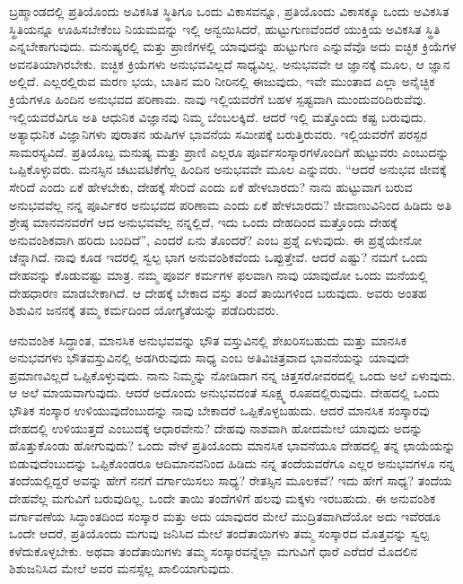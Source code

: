 ಬ್ರಹ್ಮಾಂಡದಲ್ಲಿ ಪ್ರತಿಯೊಂದು ಅವಿಕಸಿತ ಸ್ಥಿತಿಗೂ ಒಂದು ವಿಕಾಸವನ್ನೂ, ಪ್ರತಿಯೊಂದು ವಿಕಾಸಕ್ಕೂ ಒಂದು ಅವಿಕಸಿತ ಸ್ಥಿತಿಯನ್ನೂ ಊಹಿಸಬೇಕೆಂಬ ನಿಯಮವನ್ನು ಇಲ್ಲಿ ಅನ್ವಯಿಸಿದರೆ, ಹುಟ್ಟುಗುಣವೆಂದರೆ ಯುಕ್ತಿಯ ಅವಿಕಸಿತ ಸ್ಥಿತಿ ಎನ್ನಬೇಕಾಗುವುದು. ಮನುಷ್ಯರಲ್ಲಿ ಮತ್ತು ಪ್ರಾಣಿಗಳಲ್ಲಿ ಯಾವುದನ್ನು ಹುಟ್ಟುಗುಣ ಎನ್ನುವೆವೊ ಅದು ಐಚ್ಛಿಕ ಕ್ರಿಯೆಗಳ ಅವನತಿಯಾಗಿರಬೇಕು. ಐಚ್ಛಿಕ ಕ್ರಿಯೆಗಳು ಅನುಭವವಿಲ್ಲದೆ ಸಾಧ್ಯವಿಲ್ಲ. ಅನುಭವವೇ ಆ ಜ್ಞಾನಕ್ಕೆ ಮೂಲ, ಆ ಜ್ಞಾನ ಅಲ್ಲಿದೆ. ಎಲ್ಲರಲ್ಲಿರುವ ಮರಣ ಭಯ, ಬಾತಿನ ಮರಿ ನೀರಿನಲ್ಲಿ ಈಜುವುದು, ಇವೇ ಮುಂತಾದ ಎಲ್ಲಾ ಅನೈಚ್ಛಿಕ ಕ್ರಿಯೆಗಳೂ ಹಿಂದಿನ ಅನುಭವದ ಪರಿಣಾಮ. ನಾವು ಇಲ್ಲಿಯವರೆಗೆ ಬಹಳ ಸ್ಪಷ್ಟವಾಗಿ ಮುಂದುವರಿದಿರುವೆವು. ಇಲ್ಲಿಯವರೆವಿಗೂ ಅತಿ ಆಧುನಿಕ ವಿಜ್ಞಾನವು ನಿಮ್ಮ ಬೆಂಬಲಕ್ಕಿದೆ. ಆದರೆ ಇಲ್ಲಿ ಮತ್ತೊಂದು ಕಷ್ಟ ಬರುವುದು. ಅತ್ಯಾಧುನಿಕ ವಿಜ್ಞಾನಿಗಳು ಪುರಾತನ ಋಷಿಗಳ ಭಾವನೆಯ ಸಮೀಪಕ್ಕೆ ಬರುತ್ತಿರುವರು. ಇಲ್ಲಿಯವರೆಗೆ ಪರಸ್ಪರ ಸಾಮರಸ್ಯವಿದೆ. ಪ್ರತಿಯೊಬ್ಬ ಮನುಷ್ಯ ಮತ್ತು ಪ್ರಾಣಿ ಎಲ್ಲರೂ ಪೂರ್ವಸಂಸ್ಕಾರಗಳೊಂದಿಗೆ ಹುಟ್ಟುವರು ಎಂಬುದನ್ನು ಒಪ್ಪಿಕೊಳ್ಳುವರು. ಮನಸ್ಸಿನ ಚಟುವಟಿಕೆಗೆಲ್ಲ ಹಿಂದಿನ ಅನುಭವವೇ ಮೂಲ ಎನ್ನುವರು. “ಆದರೆ ಅನುಭವ ಜೀವಕ್ಕೆ ಸೇರಿದೆ ಎಂದು ಏಕೆ ಹೇಳಬೇಕು, ದೇಹಕ್ಕೆ ಸೇರಿದೆ ಎಂದು ಏಕೆ ಹೇಳಬಾರದು? ನಾನು ಹುಟ್ಟುವಾಗ ಬರುವ ಅನುಭವವೆಲ್ಲ ನನ್ನ ಪೂರ್ವಿಕರ ಅನುಭವದ ಪರಿಣಾಮ ಎಂದು ಏಕೆ ಹೇಳಬಾರದು? ಜೀವಾಣುವಿನಿಂದ ಹಿಡಿದು ಅತಿ ಶ್ರೇಷ್ಠ ಮಾನವನವರೆಗೆ ಆದ ಅನುಭವವೆಲ್ಲ ನನ್ನಲ್ಲಿದೆ, ಇದು ಒಂದು ದೇಹದಿಂದ ಮತ್ತೊಂದು ದೇಹಕ್ಕೆ ಅನುವಂಶಿಕವಾಗಿ ಹರಿದು ಬಂದಿದೆ”, ಎಂದರೆ ಏನು ತೊಂದರೆ? ಎಂಬ ಪ್ರಶ್ನೆ ಏಳುವುದು. ಈ ಪ್ರಶ್ನೆಯೇನೋ ಚೆನ್ನಾಗಿದೆ. ನಾವು ಕೂಡ ಇದರಲ್ಲಿ ಸ್ವಲ್ಪ ಭಾಗ ಅನುವಂಶಿಕವೆಂದು ಒಪ್ಪುತ್ತೇವೆ. ಆದರೆ ಎಷ್ಟು? ನಮಗೆ ಒಂದು ದೇಹವನ್ನು ಕೊಡುವಷ್ಟು ಮಾತ್ರ. ನಮ್ಮ ಪೂರ್ವ ಕರ್ಮಗಳ ಫಲವಾಗಿ ನಾವು ಯಾವುದೋ ಒಂದು ಮನೆಯಲ್ಲಿ ದೇಹಧಾರಣ ಮಾಡಬೇಕಾಗಿದೆ. ಆ ದೇಹಕ್ಕೆ ಬೇಕಾದ ವಸ್ತು ತಂದೆ ತಾಯಿಗಳಿಂದ ಬರುವುದು. ಅವರು ಅಂತಹ ಶಿಶುವಿನ ಜನನಕ್ಕೆ ತಮ್ಮ ಕರ್ಮದಿಂದ ಯೋಗ್ಯತೆಯನ್ನು ಪಡೆದಿರುವರು.

\vskip 0.2cm

ಆನುವಂಶಿಕ ಸಿದ್ಧಾಂತ, ಮಾನಸಿಕ ಅನುಭವವನ್ನು ಭೌತ ವಸ್ತುವಿನಲ್ಲಿ ಶೇಖರಿಸಬಹುದು ಮತ್ತು ಮಾನಸಿಕ ಅನುಭವಗಳು ಭೌತವಸ್ತುವಿನಲ್ಲಿ ಅಡಗಿರುವುದು ಸಾಧ್ಯ ಎಂಬ ಅತಿವಿಚಿತ್ರವಾದ ಭಾವನೆಯನ್ನು ಯಾವುದೇ ಪ್ರಮಾಣವಿಲ್ಲದೆ ಒಪ್ಪಿಕೊಳ್ಳುವುದು. ನಾನು ನಿಮ್ಮನ್ನು ನೋಡಿದಾಗ ನನ್ನ ಚಿತ್ತಸರೋವರದಲ್ಲಿ ಒಂದು ಅಲೆ ಏಳುವುದು. ಆ ಅಲೆ ಮಾಯವಾಗುವುದು. ಆದರೆ ಅದೊಂದು ಅನುಭವದಂತೆ ಸೂಕ್ಷ್ಮ ರೂಪದಲ್ಲಿರುವುದು. ದೇಹದಲ್ಲಿ ಒಂದು ಭೌತಿಕ ಸಂಸ್ಕಾರ ಉಳಿಯುವುದೆಂಬುದನ್ನು ನಾವು ಬೇಕಾದರೆ ಒಪ್ಪಿಕೊಳ್ಳಬಹುದು. ಆದರೆ ಮಾನಸಿಕ ಸಂಸ್ಕಾರವು ದೇಹದಲ್ಲಿ ಉಳಿಯುತ್ತದೆ ಎಂಬುದಕ್ಕೆ ಆಧಾರವೇನು? ದೇಹವು ನಾಶವಾಗಿ ಹೋದಮೇಲೆ ಯಾವುದು ಅದನ್ನು ಹೊತ್ತುಕೊಂಡು ಹೋಗುವುದು? ಒಂದು ವೇಳೆ ಪ್ರತಿಯೊಂದು ಮಾನಸಿಕ ಭಾವನೆಯೂ ದೇಹದಲ್ಲಿ ತನ್ನ ಛಾಯೆಯನ್ನು ಬಿಡುವುದೆಂಬುದನ್ನು ಒಪ್ಪಿಕೊಂಡರೂ ಆದಿಮಾನವನಿಂದ ಹಿಡಿದು ನನ್ನ ತಂದೆಯವರೆಗೂ ಎಲ್ಲರ ಅನುಭವಗಳೂ ನನ್ನ ತಂದೆಯಲ್ಲಿದ್ದರೆ ಅವನ್ನು ಹೇಗೆ ನನಗೆ ವರ್ಗಾಯಿಸಲು ಸಾಧ್ಯ? ರೇತಸ್ಸಿನ ಮೂಲಕವೆ? ಇದು ಹೇಗೆ ಸಾಧ್ಯ? ತಂದೆಯ ದೇಹವೆಲ್ಲ ಮಗುವಿಗೆ ಬರುವುದಿಲ್ಲ. ಒಂದೇ ತಾಯಿ ತಂದೆಗಳಿಗೆ ಹಲವು ಮಕ್ಕಳು ಇರಬಹುದು. ಈ ಅನುವಂಶಿಕ ವರ್ಗಾವಣೆಯ ಸಿದ್ಧಾಂತದಿಂದ ಸಂಸ್ಕಾರ ಮತ್ತು ಅದು ಯಾವುದರ ಮೇಲೆ ಮುದ್ರಿತವಾಗಿದೆಯೋ ಅದು ಇವೆರಡೂ ಒಂದೇ ಆದರೆ, ಪ್ರತಿಯೊಂದು ಮಗುವು ಜನಿಸಿದ ಮೇಲೆ ತಂದೆತಾಯಿಗಳು ತಮ್ಮ ಸಂಸ್ಕಾರದ ಮೊತ್ತವನ್ನು ಸ್ವಲ್ಪ ಕಳೆದುಕೊಳ್ಳಬೇಕು. ಅಥವಾ ತಂದೆತಾಯಿಗಳು ತಮ್ಮ ಸಂಸ್ಕಾರವನ್ನೆಲ್ಲಾ ಮಗುವಿಗೆ ಧಾರೆ ಎರೆದರೆ ಮೊದಲಿನ ಶಿಶು\break ಜನಿಸಿದ ಮೇಲೆ ಅವರ ಮನಸ್ಸೆಲ್ಲ ಖಾಲಿಯಾಗುವುದು.

